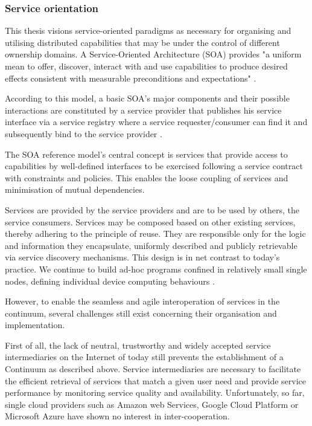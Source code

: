 \documentclass{ieeeaccess}
\begin{document}
\subsubsection{Service orientation}

This thesis visions service-oriented paradigms as necessary for organising and utilising distributed capabilities that may be under the control of different ownership domains. A Service-Oriented Architecture (SOA) provides "a uniform mean to offer, discover, interact with and use capabilities to produce desired effects consistent with measurable preconditions and expectations" \cite{oasis}.

According to this model, a basic SOA's major components and their possible interactions are constituted by a service provider that publishes his service interface via a service registry where a service requester/consumer can find it and subsequently bind to the service provider \cite{iot-enterprise}.

The SOA reference model's central concept is services that provide access to capabilities by well-defined interfaces to be exercised following a service contract with constraints and policies. This enables the loose coupling of services and minimisation of mutual dependencies.

Services are provided by the service providers and are to be used by others, the service consumers. Services may be composed based on other existing services, thereby adhering to the principle of reuse. They are responsible only for the logic and information they encapsulate, uniformly described and publicly retrievable via service discovery mechanisms. This design is in net contrast to today's practice. We continue to build ad-hoc programs confined in relatively small single nodes, defining individual device computing behaviours \cite{harnessing-continuum}.

However, to enable the seamless and agile interoperation of services in the continuum, several challenges still exist concerning their organisation and implementation.

First of all, the lack of neutral, trustworthy and widely accepted service intermediaries on the Internet of today still prevents the establishment of a Continuum as described above. Service intermediaries are necessary to facilitate the efficient retrieval of services that match a given user need and provide service performance by monitoring service quality and availability. Unfortunately, so far, single cloud providers such as Amazon web Services, Google Cloud Platform or Microsoft Azure have shown no interest in inter-cooperation.
\end{document}

